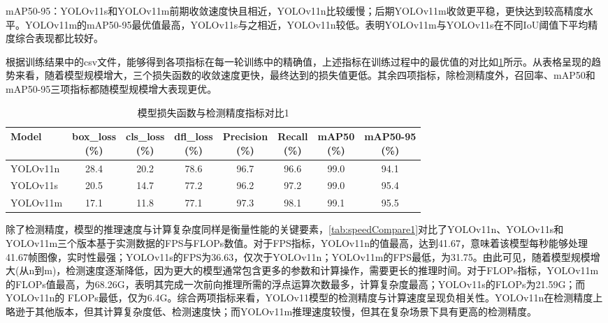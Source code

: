 mAP50-95：YOLOv11s和YOLOv11m前期收敛速度快且相近，YOLOv11n比较缓慢；后期YOLOv11m收敛更平稳，更快达到较高精度水平。YOLOv11m的mAP50-95最优值最高，YOLOv11s与之相近，YOLOv11n较低。表明YOLOv11m与YOLOv11s在不同IoU阈值下平均精度综合表现都比较好。

根据训练结果中的csv文件，能够得到各项指标在每一轮训练中的精确值，上述指标在训练过程中的最优值的对比如\ref{tab:modelCompare1}所示。从表格呈现的趋势来看，随着模型规模增大，三个损失函数的收敛速度更快，最终达到的损失值更低。其余四项指标，除检测精度外，召回率、mAP50和mAP50-95三项指标都随模型规模增大表现更优。

\begin{table}[htb]
    \centering
    \caption[目标数据]{模型损失函数与检测精度指标对比1\label{tab:modelCompare1}}
    \begin{tabular}{lccccccc}
        \toprule
        Model & 
        \makecell{box\_loss\\(\%)} & 
        \makecell{cls\_loss\\(\%)} & 
        \makecell{dfl\_loss\\(\%)} & 
        \makecell{Precision\\(\%)} & 
        \makecell{Recall\\(\%)} & 
        \makecell{mAP50\\(\%)} & 
        \makecell{mAP50-95\\(\%)} \\
        \midrule
        YOLOv11n & 28.4 & 20.2 & 78.6 & 96.7 & 96.6 & 99.0 & 94.1 \\
        YOLOv11s & 20.5 & 14.7 & 77.2 & 96.2 & 97.2 & 99.0 & 95.4 \\
        YOLOv11m & 17.1 & 11.8 & 77.1 & 97.3 & 98.1 & 99.1 & 95.5 \\
        \bottomrule
    \end{tabular}
\end{table}


除了检测精度，模型的推理速度与计算复杂度同样是衡量性能的关键要素，\ref {tab:speedCompare1}对比了YOLOv11n、YOLOv11s和YOLOv11m三个版本基于实测数据的FPS与FLOPs数值。对于FPS指标，YOLOv11n的值最高，达到41.67，意味着该模型每秒能够处理41.67帧图像，实时性最强；YOLOv11s的FPS为36.63，仅次于YOLOv11n；YOLOv11m的FPS最低，为31.75。由此可见，随着模型规模增大(从n到m)，检测速度逐渐降低，因为更大的模型通常包含更多的参数和计算操作，需要更长的推理时间。对于FLOPs指标，YOLOv11m的FLOPs值最高，为68.26G，表明其完成一次前向推理所需的浮点运算次数最多，计算复杂度最高；YOLOv11s的FLOPs为21.59G；而YOLOv11n的 FLOPs最低，仅为6.4G。综合两项指标来看，YOLOv11模型的检测精度与计算速度呈现负相关性。YOLOv11n在检测精度上略逊于其他版本，但其计算复杂度低、检测速度快；而YOLOv11m推理速度较慢，但其在复杂场景下具有更高的检测精度。

